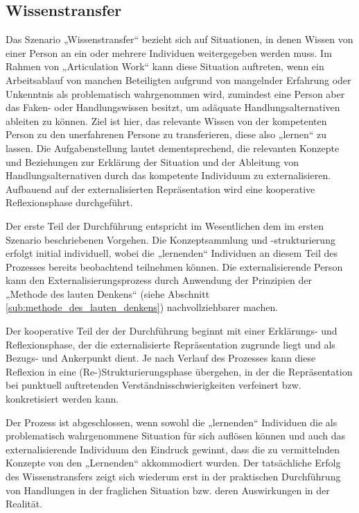 \subsection{Wissenstransfer} %
\label{sub:wissenstransfer}

Das Szenario „Wissenstransfer“ bezieht sich auf Situationen, in denen Wissen von einer Person an ein oder mehrere Individuen weitergegeben werden muss. Im Rahmen von „Articulation Work“ kann diese Situation auftreten, wenn ein Arbeitsablauf von manchen Beteiligten aufgrund von mangelnder Erfahrung oder Unkenntnis als problematisch wahrgenommen wird, zumindest eine Person aber das Faken- oder Handlungswissen besitzt, um adäquate Handlungsalternativen ableiten zu können. Ziel ist hier, das relevante Wissen von der kompetenten Person zu den unerfahrenen Persone zu transferieren, diese also „lernen“ zu lassen. Die Aufgabenstellung lautet dementsprechend, die relevanten Konzepte und Beziehungen zur Erklärung der Situation und der Ableitung von Handlungsalternativen durch das kompetente Individuum zu externalisieren. Aufbauend auf der externalisierten Repräsentation wird eine kooperative Reflexionsphase durchgeführt. 

Der erste Teil der Durchführung entspricht im Wesentlichen dem im ersten Szenario beschriebenen Vorgehen. Die Konzeptsammlung und -strukturierung erfolgt initial individuell, wobei die „lernenden“ Individuen an diesem Teil des Prozesses bereits beobachtend teilnehmen können. Die externalisierende Person kann den Externalisierungsprozess durch Anwendung der Prinzipien der „Methode des lauten Denkens“ (siehe Abschnitt \ref{sub:methode_des_lauten_denkens}) nachvollziehbarer machen. 

Der kooperative Teil der der Durchführung beginnt mit einer Erklärungs- und Reflexionsphase, der die externalisierte Repräsentation zugrunde liegt und als Bezugs- und Ankerpunkt dient. Je nach Verlauf des Prozesses kann diese Reflexion in eine (Re-)Strukturierungsphase übergehen, in der die Repräsentation bei punktuell auftretenden Verständnisschwierigkeiten verfeinert bzw. konkretisiert werden kann. 

Der Prozess ist abgeschlossen, wenn sowohl die „lernenden“ Individuen die als problematisch wahrgenommene Situation für sich auflösen können und auch das externalisierende Individuum den Eindruck gewinnt, dass die zu vermittelnden Konzepte von den „Lernenden“ akkommodiert wurden. Der tatsächliche Erfolg des Wissenstransfers zeigt sich wiederum erst in der praktischen Durchführung von Handlungen in der fraglichen Situation bzw. deren Auswirkungen in der Realität.

